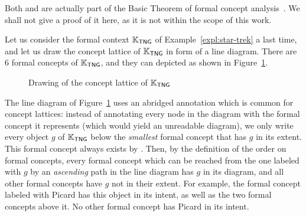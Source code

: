 Both  and
 are actually part of the Basic Theorem
of formal concept analysis~\cite[Theorem 3]{fca-book}.  We shall not give a proof of it
here, as it is not within the scope of this work.

\begin{Example}
  \label{expl:star-trek-concept-lattice}
  Let us consider the formal context ${\mathbb{K}}_{\mathsf{TNG}}$ of
  Example~\ref{expl:star-trek} a last time, and let us draw the concept lattice of ${\mathbb{K}}_{\mathsf{TNG}}$ in form of a line diagram.  There are 6 formal concepts of ${\mathbb{K}}_{\mathsf{TNG}}$, and they can depicted as shown in
  Figure~\ref{fig:star-trek-concept-lattice}.

  \begin{figure}[tp]
    \centering
    \caption{Drawing of the concept lattice of ${\mathbb{K}}_{\mathsf{TNG}}$}
    \label{fig:star-trek-concept-lattice}
  \end{figure}

  The line diagram of Figure~\ref{fig:star-trek-concept-lattice} uses an abridged
  annotation which is common for concept lattices: instead of annotating every node in the
  diagram with the formal concept it represents (which would yield an unreadable diagram),
  we only write every object $g$ of ${\mathbb{K}}_{\mathsf{TNG}}$ below the \emph{smallest}
  formal concept that has $g$ in its extent.  This formal concept always exists by
  .  Then, by the definition of the
  order on formal concepts, every formal concept which can be reached from the one labeled
  with $g$ by an \emph{ascending} path in the line diagram has $g$ in its diagram, and all
  other formal concepts have $g$ not in their extent.  For example, the formal concept
  labeled with \textsf{Picard} has this object in its intent, as well as the two formal
  concepts above it.  No other formal concept has \textsf{Picard} in its intent.


\end{Example}
